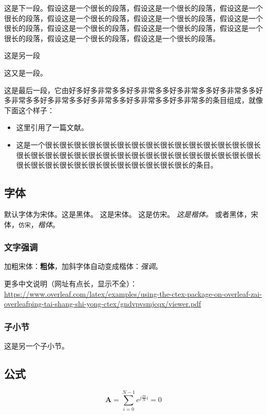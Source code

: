 \documentclass[12pt]{article} %
\begin{document}
这是下一段。假设这是一个很长的段落，假设这是一个很长的段落，假设这是一个很长的段落，假设这是一个很长的段落，假设这是一个很长的段落，假设这是一个很长的段落，假设这是一个很长的段落，假设这是一个很长的段落，假设这是一个很长的段落，假设这是一个很长的段落，假设这是一个很长的段落。

这是另一段

这又是一段。

这是最后一段，它由好多好多非常多多好多非常多多好多非常多多好多非常多多好多非常多多好多非常多多好多非常多多好多非常多多好多非常多的条目组成，就像下面这个样子：

\begin{itemize}
  \item 这里引用了一篇文献\cite{aokiPointNetLKRobustEfficient2019}。
  \item 这是一个很长很长很长很长很长很长很长很长很长很长很长很长很长很长很长很长很长很长很长很长很长很长很长很长很长很长很长很长很长很长很长很长很长很长很长很长很长很长很长很长很长很长很长很长的条目。
\end{itemize}

\subsection{字体}
默认字体为宋体。{\sffamily 这是黑体。} {\rmfamily 这是宋体。} {\ttfamily 这是仿宋。} {\it 这是楷体。}
或者\textsf{黑体}，\textrm{宋体}，\texttt{仿宋}，\textit{楷体}。

\subsubsection{文字强调}
加粗宋体：\textbf{粗体}，加斜字体自动变成楷体：\textit{强调}。

更多中文说明（网址有点长，显示不全）：\\\url{https://www.overleaf.com/latex/examples/using-the-ctex-package-on-overleaf-zai-overleafping-tai-shang-shi-yong-ctex/gndvpvsmjcqx/viewer.pdf}

\subsubsection{子小节}
这是另一个子小节。

\subsection{公式}
\begin{equation}
\label{eqn:eqn1}
\mathbf{A}=\sum\limits_{i=0}^{N-1}{e^{j\frac{2\pi}{N}i}}=0
\end{equation}
\end{document}
